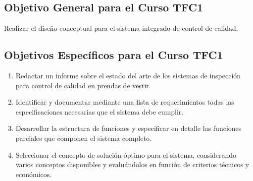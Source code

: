 \subsection{Objetivo General para el Curso TFC1}

Realizar el diseño conceptual para el sistema integrado de control de calidad. 

\subsection{Objetivos Específicos para el Curso TFC1}

\begin{enumerate}
	\setlength\itemsep{-0.5em}
	\item Redactar un informe sobre el estado del arte de los sistemas de inspección para control de calidad en prendas de vestir.
	\item Identificar y documentar mediante una lista de requerimientos todas las especificaciones necesarias que el sistema debe cumplir.
	\item Desarrollar la estructura de funciones y especificar en detalle las funciones parciales que componen el sistema completo.
	\item Seleccionar el concepto de solución óptimo para el sistema, considerando varios conceptos disponibles y evaluándolos en función de criterios técnicos y económicos.
\end{enumerate}